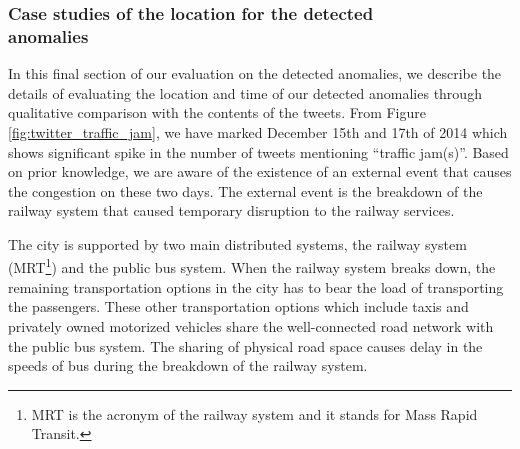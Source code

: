 \documentclass[conference]{IEEEtran.1.8}
\begin{document}
\subsubsection{Case studies of the location for the detected\\anomalies}

In this final section of our evaluation on the detected anomalies, we describe the details of evaluating the location and time of our detected anomalies through qualitative comparison with the contents of the tweets. From Figure \ref{fig:twitter_traffic_jam}, we have marked December 15th and 17th of 2014 which shows significant spike in the number of tweets mentioning ``traffic jam(s)''. Based on prior knowledge, we are aware of the existence of an external event that causes the congestion on these two days. The external event is the breakdown of the railway system that caused temporary disruption to the railway services.

The city is supported by two main distributed systems, the railway system (MRT\footnote{MRT is the acronym of the railway system and it stands for Mass Rapid Transit.}) and the public bus system. When the railway system breaks down, the remaining transportation options in the city has to bear the load of transporting the passengers. These other transportation options which include taxis and privately owned motorized vehicles share the well-connected road network with the public bus system. The sharing of physical road space causes delay in the speeds of bus during the breakdown of the railway system. 
\end{document}

